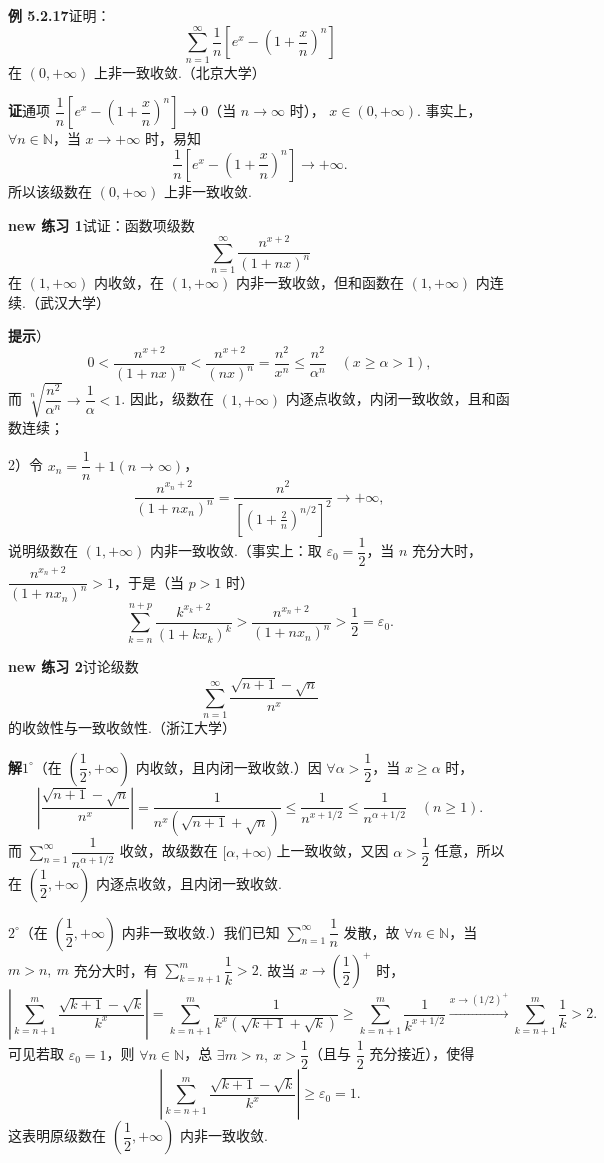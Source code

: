 \documentclass[UTF8, 12pt, fontset=fandol, oneside]{ctexart}
\begin{document}
\noindent\textbf{例 5.2.17}\quad 证明：
\[
  \sum_{n=1}^{\infty}\frac1n\left[e^x-\left(1+\frac{x}{n}\right)^n\right]
\]
在 $(0,+\infty)$ 上非一致收敛.（北京大学）

\noindent\textbf{证}\quad 通项
$\dfrac1n\left[e^x-\left(1+\dfrac{x}{n}\right)^n\right]\to0$（当 $n\to\infty$ 时），
$x\in(0,+\infty)$. 事实上，$\forall n\in\mathbb N$，当 $x\to+\infty$ 时，易知
\[
  \frac1n\left[e^x-\left(1+\frac{x}{n}\right)^n\right]\to+\infty.
\]
所以该级数在 $(0,+\infty)$ 上非一致收敛.

\noindent\textbf{new 练习 1}\quad 试证：函数项级数
\[
  \sum_{n=1}^{\infty}\frac{n^{x+2}}{(1+nx)^n}
\]
在 $(1,+\infty)$ 内收敛，在 $(1,+\infty)$ 内非一致收敛，但和函数在 $(1,+\infty)$ 内连续.（武汉大学）

\noindent\textbf{提示}）
\[
  0<\frac{n^{x+2}}{(1+nx)^n}
  <\frac{n^{x+2}}{(nx)^n}
  =\frac{n^2}{x^n}\le\frac{n^2}{\alpha^n}\quad(x\ge\alpha>1),
\]
而 $\sqrt[n]{\dfrac{n^2}{\alpha^n}}\to\dfrac1\alpha<1$. 因此，级数在
$(1,+\infty)$ 内逐点收敛，内闭一致收敛，且和函数连续；

2）令 $x_n=\dfrac1n+1(n\to\infty)$，
\[
  \frac{n^{x_n+2}}{(1+nx_n)^n}
  =\frac{n^2}{\left[\left(1+\frac2n\right)^{n/2}\right]^2}\to+\infty,
\]
说明级数在 $(1,+\infty)$ 内非一致收敛.（事实上：取 $\varepsilon_0=\dfrac12$，当 $n$ 充分大时，
$\dfrac{n^{x_n+2}}{(1+nx_n)^n}>1$，于是（当 $p>1$ 时）
\[
  \sum_{k=n}^{n+p}\frac{k^{x_k+2}}{(1+kx_k)^k}
  >\frac{n^{x_n+2}}{(1+nx_n)^n}>\frac12=\varepsilon_0.
\]

\noindent\textbf{new 练习 2}\quad 讨论级数
\[
  \sum_{n=1}^{\infty}\frac{\sqrt{n+1}-\sqrt n}{n^x}
\]
的收敛性与一致收敛性.（浙江大学）

\noindent\textbf{解}\quad $1^\circ$（在 $\left(\dfrac12,+\infty\right)$ 内收敛，且内闭一致收敛.）因
$\forall\alpha>\dfrac12$，当 $x\ge\alpha$ 时，
\[
  \left|\frac{\sqrt{n+1}-\sqrt n}{n^x}\right|
  =\frac1{n^x(\sqrt{n+1}+\sqrt n)}
  \le\frac1{n^{x+1/2}}\le\frac1{n^{\alpha+1/2}}\quad(n\ge1).
\]
而 $\displaystyle\sum_{n=1}^{\infty}\dfrac1{n^{\alpha+1/2}}$ 收敛，故级数在
$[\alpha,+\infty)$ 上一致收敛，又因 $\alpha>\dfrac12$ 任意，所以在
$\left(\dfrac12,+\infty\right)$ 内逐点收敛，且内闭一致收敛.

$2^\circ$（在 $\left(\dfrac12,+\infty\right)$ 内非一致收敛.）我们已知
$\displaystyle\sum_{n=1}^{\infty}\dfrac1n$ 发散，故 $\forall n\in\mathbb N$，当
$m>n,\ m$ 充分大时，有
$\displaystyle\sum_{k=n+1}^m\dfrac1k>2$. 故当
$x\to\left(\dfrac12\right)^+$ 时，
\[
  \left|\sum_{k=n+1}^m\frac{\sqrt{k+1}-\sqrt k}{k^x}\right|
  =\sum_{k=n+1}^m\frac1{k^x(\sqrt{k+1}+\sqrt k)}
  \ge \sum_{k=n+1}^m\frac1{k^{x+1/2}}
  \xrightarrow{x\to(1/2)^+}\sum_{k=n+1}^m\frac1k>2.
\]
可见若取 $\varepsilon_0=1$，则 $\forall n\in\mathbb N$，总 $\exists m>n,\ x>\dfrac12$（且与
$\dfrac12$ 充分接近），使得
\[
  \left|\sum_{k=n+1}^m\frac{\sqrt{k+1}-\sqrt k}{k^x}\right|\ge\varepsilon_0=1.
\]
这表明原级数在 $\left(\dfrac12,+\infty\right)$ 内非一致收敛.
\end{document}
